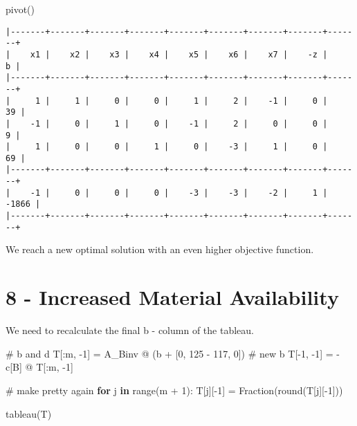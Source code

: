 \documentclass[
  letterpaper,
  DIV=11,
  numbers=noendperiod]{scrartcl}
\newenvironment{Shaded}{\begin{snugshade}}{\end{snugshade}}
\newcommand{\BuiltInTok}[1]{\textcolor[rgb]{0.00,0.23,0.31}{#1}}
\newcommand{\CommentTok}[1]{\textcolor[rgb]{0.37,0.37,0.37}{#1}}
\newcommand{\ControlFlowTok}[1]{\textcolor[rgb]{0.00,0.23,0.31}{\textbf{#1}}}
\newcommand{\DecValTok}[1]{\textcolor[rgb]{0.68,0.00,0.00}{#1}}
\newcommand{\KeywordTok}[1]{\textcolor[rgb]{0.00,0.23,0.31}{\textbf{#1}}}
\newcommand{\NormalTok}[1]{\textcolor[rgb]{0.00,0.23,0.31}{#1}}
\newcommand{\OperatorTok}[1]{\textcolor[rgb]{0.37,0.37,0.37}{#1}}
\begin{document}
\begin{Shaded}
\begin{Highlighting}[]
\NormalTok{pivot()}
\end{Highlighting}
\end{Shaded}

\begin{verbatim}
|-------+-------+-------+-------+-------+-------+-------+-------+-------+
|    x1 |    x2 |    x3 |    x4 |    x5 |    x6 |    x7 |    -z |     b |
|-------+-------+-------+-------+-------+-------+-------+-------+-------+
|     1 |     1 |     0 |     0 |     1 |     2 |    -1 |     0 |    39 |
|    -1 |     0 |     1 |     0 |    -1 |     2 |     0 |     0 |     9 |
|     1 |     0 |     0 |     1 |     0 |    -3 |     1 |     0 |    69 |
|-------+-------+-------+-------+-------+-------+-------+-------+-------+
|    -1 |     0 |     0 |     0 |    -3 |    -3 |    -2 |     1 | -1866 |
|-------+-------+-------+-------+-------+-------+-------+-------+-------+
\end{verbatim}

We reach a new optimal solution with an even higher objective function.

\newpage

\section{8 - Increased Material
Availability}\label{increased-material-availability}

We need to recalculate the final b - column of the tableau.

\begin{Shaded}
\begin{Highlighting}[]
\CommentTok{\# b and d}
\NormalTok{T[:m, }\OperatorTok{{-}}\DecValTok{1}\NormalTok{] }\OperatorTok{=}\NormalTok{ A\_Binv }\OperatorTok{@}\NormalTok{ (b }\OperatorTok{+}\NormalTok{ [}\DecValTok{0}\NormalTok{, }\DecValTok{125} \OperatorTok{{-}} \DecValTok{117}\NormalTok{, }\DecValTok{0}\NormalTok{]) }\CommentTok{\# new b}
\NormalTok{T[}\OperatorTok{{-}}\DecValTok{1}\NormalTok{, }\OperatorTok{{-}}\DecValTok{1}\NormalTok{] }\OperatorTok{=} \OperatorTok{{-}}\NormalTok{ c[B] }\OperatorTok{@}\NormalTok{ T[:m, }\OperatorTok{{-}}\DecValTok{1}\NormalTok{]}

\CommentTok{\# make pretty again}
\ControlFlowTok{for}\NormalTok{ j }\KeywordTok{in} \BuiltInTok{range}\NormalTok{(m }\OperatorTok{+} \DecValTok{1}\NormalTok{):}
\NormalTok{    T[j][}\OperatorTok{{-}}\DecValTok{1}\NormalTok{] }\OperatorTok{=}\NormalTok{ Fraction(}\BuiltInTok{round}\NormalTok{(T[j][}\OperatorTok{{-}}\DecValTok{1}\NormalTok{]))}

\NormalTok{tableau(T)}
\end{Highlighting}
\end{Shaded}
\end{document}
